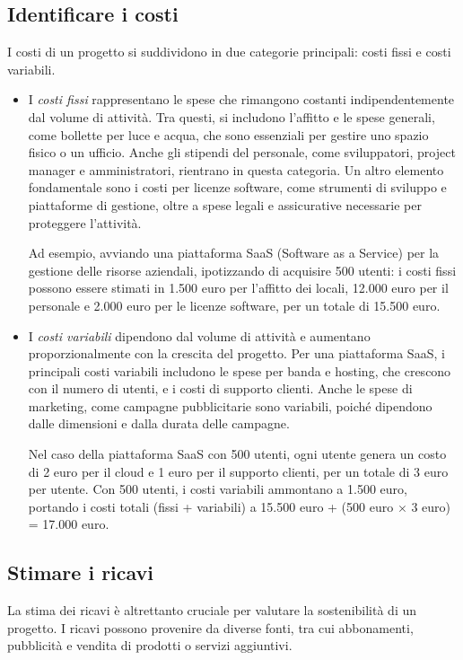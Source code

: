 \subsection{Identificare i costi}
I costi di un progetto si suddividono in due categorie principali: costi fissi e costi variabili.
\begin{itemize}
    \item I \textit{costi fissi} rappresentano le spese che rimangono costanti indipendentemente dal volume di attività. Tra questi, si includono l’affitto e le spese generali, come bollette per luce e acqua, che sono essenziali per gestire uno spazio fisico o un ufficio. Anche gli stipendi del personale, come sviluppatori, project manager e amministratori, rientrano in questa categoria. Un altro elemento fondamentale sono i costi per licenze software, come strumenti di sviluppo e piattaforme di gestione, oltre a spese legali e assicurative necessarie per proteggere l’attività.

    Ad esempio, avviando una piattaforma SaaS (Software as a Service) per la gestione delle risorse aziendali, ipotizzando di acquisire 500 utenti: i costi fissi possono essere stimati in 1.500 euro per l’affitto dei locali, 12.000 euro per il personale e 2.000 euro per le licenze software, per un totale di 15.500 euro.

    \item I \textit{costi variabili} dipendono dal volume di attività e aumentano proporzionalmente con la crescita del progetto. Per una piattaforma SaaS, i principali costi variabili includono le spese per banda e hosting, che crescono con il numero di utenti, e i costi di supporto clienti. Anche le spese di marketing, come campagne pubblicitarie sono variabili, poiché dipendono dalle dimensioni e dalla durata delle campagne.

    Nel caso della piattaforma SaaS con 500 utenti, ogni utente genera un costo di 2 euro per il cloud e 1 euro per il supporto clienti, per un totale di 3 euro per utente. Con 500 utenti, i costi variabili ammontano a 1.500 euro, portando i costi totali (fissi + variabili) a 15.500 euro + (500 euro $\times$ 3 euro) = 17.000 euro.
\end{itemize}

\subsection{Stimare i ricavi}
La stima dei ricavi è altrettanto cruciale per valutare la sostenibilità di un progetto. I ricavi possono provenire da diverse fonti, tra cui abbonamenti, pubblicità e vendita di prodotti o servizi aggiuntivi.

